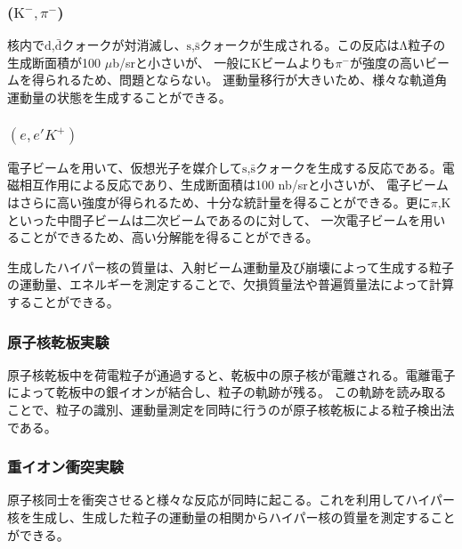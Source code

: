 \documentclass[a4paper,11pt,uplatex]{jsbook}
\begin{document}
\subsubsection{($\text{K}^-, \pi^-$)}
核内で$\text{d}$,$\bar{\text{d}}$クォークが対消滅し、$\text{s}$,$\bar{\text{s}}$クォークが生成される。この反応はΛ粒子の生成断面積が100 $\mu$b/srと小さいが、
一般にKビームよりも$\pi^-$が強度の高いビームを得られるため、問題とならない。
運動量移行が大きいため、様々な軌道角運動量の状態を生成することができる。
\subsubsection{$(e,e'K^+)$}
電子ビームを用いて、仮想光子を媒介して$\text{s}$,$\bar{\text{s}}$クォークを生成する反応である。電磁相互作用による反応であり、生成断面積は100 nb/srと小さいが、
電子ビームはさらに高い強度が得られるため、十分な統計量を得ることができる。更に$\pi$,Kといった中間子ビームは二次ビームであるのに対して、
一次電子ビームを用いることができるため、高い分解能を得ることができる。

生成したハイパー核の質量は、入射ビーム運動量及び崩壊によって生成する粒子の運動量、エネルギーを測定することで、欠損質量法や普遍質量法によって計算することができる。
\subsubsection{原子核乾板実験}
原子核乾板中を荷電粒子が通過すると、乾板中の原子核が電離される。電離電子によって乾板中の銀イオンが結合し、粒子の軌跡が残る。
この軌跡を読み取ることで、粒子の識別、運動量測定を同時に行うのが原子核乾板による粒子検出法である。
\subsubsection{重イオン衝突実験}
原子核同士を衝突させると様々な反応が同時に起こる。これを利用してハイパー核を生成し、生成した粒子の運動量の相関からハイパー核の質量を測定することができる。
\end{document}
